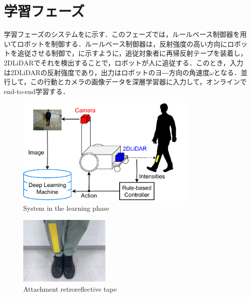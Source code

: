 
\section{学習フェーズ}

  学習フェーズのシステムをに示す．このフェーズでは，ルールベース制御器を用いてロボットを制御する．ルールベース制御器は，反射強度の高い方向にロボットを追従させる制御で，に示すように，追従対象者に再帰反射テープを装着し，2DLiDARでそれを検出することで，ロボットが人に追従する．このとき，入力は2DLiDARの反射強度であり，出力はロボットのヨ―方向の角速度$\omega$となる．並行して，この行動とカメラの画像データを深層学習器に入力して，オンラインでend-to-end学習する．

  \vspace{0.5cm}

  \begin{figure}[h]
    \centering
    \includegraphics[width=9cm] {images/pdf/RobotGuidance_learning_system}
    \captionsetup{justification=raggedright} %
    \caption{System in the learning phase}
    \label{Fig:RobotGuidance_learning_system}
  \end{figure}

  \vspace{0.5cm}

  \begin{figure}[h]
    \centering
    \includegraphics[width=4.5cm] {images/pdf/RobotGuidance_learning_phase_leg}
    \captionsetup{justification=raggedright} %
    \caption{Attachment retroreflective tape}
    \label{Fig:RobotGuidance_learning_phase_leg}
  \end{figure}

\newpage
